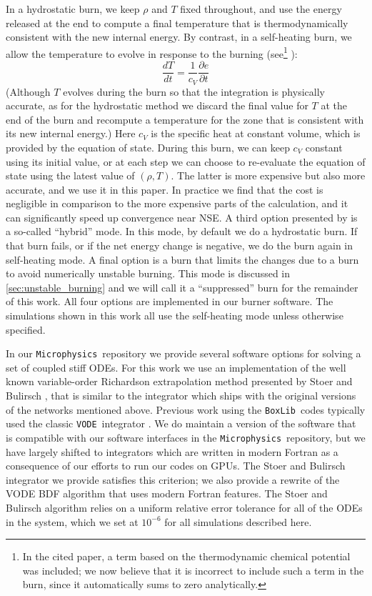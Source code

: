 \documentclass[twocolumn,numberedappendix]{../aastex6}
\newcommand{\boxlib}{\texttt{BoxLib}}
\newcommand{\microphysics}{\texttt{Microphysics}}
\newcommand{\vode}{\texttt{VODE}}
\begin{document}
In a hydrostatic burn, we keep $\rho$ and $T$ fixed throughout, and use
the energy released at the end to compute a final temperature that is
thermodynamically consistent with the new internal energy. By contrast,
in a self-heating burn, we allow the temperature to evolve in response
to the burning (see\footnote{In the cited paper, a term based on the
thermodynamic chemical potential was included; we now believe
that it is incorrect to include such a term in the burn, since it
automatically sums to zero analytically.} \citet{maestro3}):
\begin{equation}
  \frac{dT}{dt} = \frac{1}{c_V}\frac{\partial e}{\partial t}
\end{equation}
(Although $T$ evolves during the burn so that the integration is physically
accurate, as for the hydrostatic method we discard the final value
for $T$ at the end of the burn and recompute a temperature for the zone that is
consistent with its new internal energy.) Here $c_V$ is the specific heat at
constant volume, which is provided by the equation of state.  During this burn,
we can keep $c_V$ constant using its initial value, or at each step we
can choose to re-evaluate the equation of state using the latest value of $(\rho, T)$.
The latter is more expensive but also more accurate, and we use it in this paper.
In practice we find that the cost is negligible in comparison to the more expensive
parts of the calculation, and it can significantly speed up convergence near NSE.
A third option presented by \citet{raskin:2010} is a so-called ``hybrid'' mode.
In this mode, by default we do a hydrostatic burn. If that burn fails, or if the net
energy change is negative, we do the burn again in self-heating mode. A final option
is a burn that limits the changes due to a burn to avoid numerically unstable burning.
This mode is discussed in \autoref{sec:unstable_burning} and we will call it a
``suppressed'' burn for the remainder of this work. All four options
are implemented in our burner software. The simulations shown in this work all
use the self-heating mode unless otherwise specified.

In our \microphysics\ repository we provide several software options for
solving a set of coupled stiff ODEs. For this work we use an implementation of
the well known variable-order Richardson extrapolation method presented by Stoer and
Bulirsch \cite{stoer:1980}, that is similar to the integrator which ships with
the original versions of the networks mentioned above. Previous work using the \boxlib\
codes typically used the classic \vode\ integrator \cite{vode}. We do maintain a version
of the software that is compatible with our software interfaces in the \microphysics\
repository, but we have largely shifted to integrators which are written in modern
Fortran as a consequence of our efforts to run our codes on GPUs. The Stoer and Bulirsch
integrator we provide satisfies this criterion; we also provide a rewrite of the VODE
BDF algorithm that uses modern Fortran features. The Stoer and Bulirsch algorithm
relies on a uniform relative error tolerance for all of the ODEs in the system, which
we set at $10^{-6}$ for all simulations described here.
\end{document}

